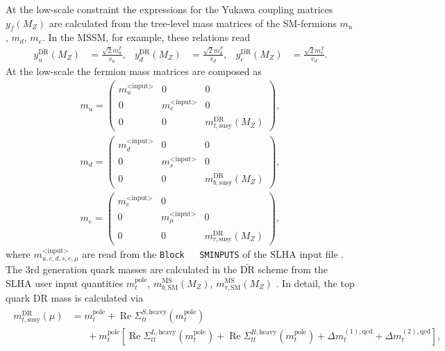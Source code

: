 \documentclass[final,3p,times,pdflatex]{elsarticle}
\newcommand{\code}[1]{\lstinline|#1|}  %
\newcommand{\textoverline}[1]{$\overline{\mbox{#1}}$}
\newcommand{\DRbar}{\textoverline{DR}\xspace}
\newcommand{\MSbar}{\textoverline{MS}\xspace}
\newcommand{\userinput}{\text{<input>}}
\DeclareMathOperator{\re}{Re}
\begin{document}
At the low-scale constraint the expressions for the Yukawa coupling
matrices $y_f(M_Z)$ are calculated from the tree-level mass matrices
of the SM-fermions $m_u$, $m_d$, $m_e$.  In the MSSM, for example,
these relations read
%
\begin{align}
  y_u^{\text{\DRbar}}(M_Z) &= \frac{\sqrt{2} m_{u}^T}{v_u} , &
  y_d^{\text{\DRbar}}(M_Z) &= \frac{\sqrt{2} m_{d}^T}{v_d} , &
  y_e^{\text{\DRbar}}(M_Z) &= \frac{\sqrt{2} m_{e}^T}{v_d}.
\end{align}
%
At the low-scale the fermion mass matrices are composed as
%
\begin{align}
  m_u =
  \begin{pmatrix}
    m_{u}^{\userinput} & 0 & 0 \\
    0 & m_{c}^{\userinput} & 0 \\
    0 & 0 & m_{t,\text{susy}}^{\text{\DRbar}}(M_Z)
  \end{pmatrix} ,\\
  m_d =
  \begin{pmatrix}
    m_{d}^{\userinput} & 0 & 0 \\
    0 & m_{s}^{\userinput} & 0 \\
    0 & 0 & m_{b,\text{susy}}^{\text{\DRbar}}(M_Z)
  \end{pmatrix} ,\\
  m_e =
  \begin{pmatrix}
    m_{e}^{\userinput} & 0 & \\
    0 & m_{\mu}^{\userinput} & 0 \\
    0 & 0 & m_{\tau,\text{susy}}^{\text{\DRbar}}(M_Z)
  \end{pmatrix},
\end{align}
%
where $m_{u,c,d,s,e,\mu}^{\userinput}$ are read from the \code{Block
  SMINPUTS} of the SLHA input file \cite{Skands:2003cj}.  The 3rd
generation quark masses are calculated in the \DRbar scheme from the
SLHA user input quantities $m_t^\text{pole}$,
$m_{b,\text{SM}}^{\text{\MSbar}}(M_Z)$,
$m_{\tau,\text{SM}}^{\text{\MSbar}}(M_Z)$ \cite{Skands:2003cj}.  In
detail, the top quark \DRbar mass is calculated via
%
\begin{align}
  \begin{split}
    m_{t,\text{susy}}^{\text{\DRbar}}(\mu) &= m_t^\text{pole} +
    \re\Sigma_{tt}^{S,\text{heavy}}(m_t^\text{pole}) \\
    &\phantom{=\;} + m_t^\text{pole}
    \left[ \re\Sigma_{tt}^{L,\text{heavy}}(m_t^\text{pole}) +
      \re\Sigma_{tt}^{R,\text{heavy}}(m_t^\text{pole}) + \Delta
      m_t^{(1),\text{qcd}} + \Delta m_t^{(2),\text{qcd}} \right] ,
  \end{split}
\end{align}
\end{document}

